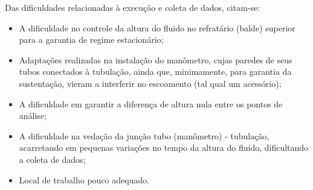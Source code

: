 Das dificuldades relacionadas à execução e coleta de dados, citam-se:
\begin{itemize}
\item A dificuldade no controle da altura do fluido no refratário (balde)
  superior para a garantia de regime estacionário;
\item Adaptações realizadas na instalação do manômetro, cujas paredes de seus
  tubos conectados à tubulação, ainda que, minimamente, para garantia da
  sustentação, vieram a interferir no escoamento (tal qual um acessório);
\item A dificuldade em garantir a diferença de altura nula entre os pontos de
  análise;
\item A dificuldade na vedação da junção tubo (manômetro) - tubulação,
acarretando em pequenas variações no tempo da altura do fluido, dificultando a
coleta de dados;
\item Local de trabalho pouco adequado.
\end{itemize}


